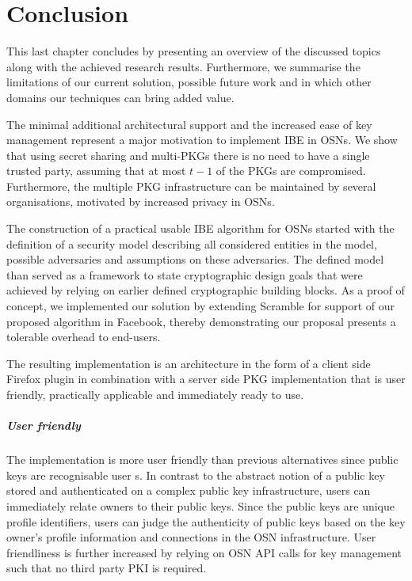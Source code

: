 \chapter{Conclusion}
\label{cha:conclusion}
This last chapter concludes by presenting an overview of the discussed topics along with the achieved research results. Furthermore, we summarise the limitations of our current solution, possible future work and in which other domains our techniques can bring added value.

The minimal additional architectural support and the increased ease of key management represent a major motivation to implement IBE in OSNs. We show that using secret sharing and multi-PKGs there is no need to have a single trusted party, assuming that at most $t-1$ of the PKGs are compromised. Furthermore, the multiple PKG infrastructure can be maintained by several organisations, motivated by increased privacy in OSNs. 

The construction of a practical usable IBE algorithm for OSNs started with the definition of a security model describing all considered entities in the model, possible adversaries and assumptions on these adversaries. The defined model than served as a framework to state cryptographic design goals that were achieved by relying on earlier defined cryptographic building blocks. As a proof of concept, we implemented our solution by extending Scramble for support of our proposed algorithm in Facebook, thereby demonstrating our proposal presents a tolerable overhead to end-users. 

The resulting implementation is an architecture in the form of a client side Firefox plugin in combination with a server side PKG implementation that is user friendly, practically applicable and immediately ready to use. 

\paragraph{User friendly} The implementation is more user friendly than previous alternatives since public keys are recognisable user \id{}s. In contrast to the abstract notion of a public key stored and authenticated on a complex public key infrastructure, users can immediately relate owners to their public keys. Since the public keys are unique profile identifiers, users can judge the authenticity of public keys based on the key owner's profile information and connections in the OSN infrastructure. User friendliness is further increased by relying on OSN API calls for key management such that no third party PKI is required.

